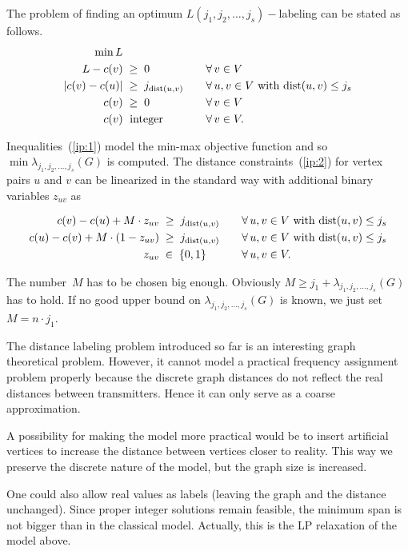 \documentclass[smallextended]{svjour3}
\def\dist{\mathop{\rm dist}}
\begin{document}
The problem of finding an optimum $L(j_1,j_2,\ldots ,j_{s})-$labeling
can be stated as follows.
\begin{alignat}{2}
\min L      &                            & \quad & \notag\\
L-c(v)       &\;\ge\;0                    & \quad &\forall\, v\in V\label{ip:1}\\
|c(v)-c(u)| &\;\geq\;j_{\dist(u,v)} & & \forall\, u,v\in V\text{ with }{\dist(u,v)}\le j_s \label{ip:2}\\
c(v)          &\;\geq\;0                  & &\forall\, v\in V \label{ip:3}\\
c(v)          &\;\text{ integer}       & & \forall\, v\in V.\label{ip:4}
\end{alignat}

Inequalities~(\ref{ip:1}) model the min-max objective function and so
$\min\lambda_{j_1,j_2,\ldots ,j_{s}}(G)$ is computed. The distance
constraints~(\ref{ip:2}) for vertex pairs $u$ and $v$ can be linearized
in the standard way with additional binary variables $z_{uv}$ as

\begin{alignat}{2}
c(v)-c(u)+M\cdot z_{uv}     &\;\geq\;j_{\dist(u,v)} & \quad& \forall\, u,v\in V\text{ with }{\dist(u,v)}\le j_s\notag\\
c(u)-c(v)+M\cdot(1-z_{uv}) &\;\geq\;j_{\dist(u,v)} &   &\forall\, u,v\in V\text{ with }{\dist(u,v)}\le j_s\notag\\
z_{uv}                                &\;\in\;\{0,1\}              &  & \forall\, u,v\in V.\notag
\end{alignat}

The number~$M$ has to be chosen big enough. Obviously
$M\geq j_1+\lambda_{j_1,j_2,\ldots ,j_{s}}(G)$ has to hold. If no good upper bound
on $\lambda_{j_1,j_2,\ldots ,j_{s}}(G)$ is known, we just set $M=n\cdot j_1$.

The distance labeling problem introduced so far is an interesting
graph theoretical problem. However, it cannot model a practical frequency
assignment problem properly because the discrete graph distances do not
reflect the real distances between transmitters. Hence it can only serve
as a coarse approximation.

A possibility for making the model more practical would be to
insert artificial vertices to increase the distance between vertices
closer to reality. This way we preserve the discrete nature of the model,
but the graph size is increased.

One could also allow real values as labels (leaving the graph and the distance
unchanged). Since proper integer solutions remain feasible,
the minimum span is not bigger than in the classical model.
Actually, this is the LP relaxation of the model above.
\end{document}
